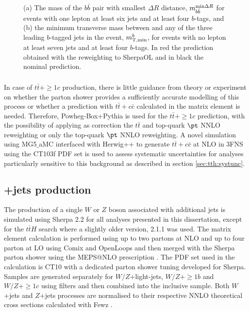 \begin{figure}[htb!]
\captionsetup{width=0.85\textwidth} \caption{\small (a) The mass of the $b\bar{b}$ pair with smallest $\Delta R$ distance, $m_{b\bar{b}}^{{\rm min}\Delta R}$ for events with one lepton at least six jets and at least four $b$-tags, and (b) the minimum transverse mass between \MET and any of the three leading $b$-tagged jets in the event, $m_{\rm T,min}^b$, for events with no lepton at least seven jets and at least four $b$-tags. In red the prediction obtained with the reweighting to {\sc SherpaOL} and in black the nominal prediction.}
\label{fig:dat:ttbb:reweigting}
\end{figure}

\subsubsection[$t\bar{t}+\ge 1c$]{}
\label{sec:data:ttc}
In case of $t\bar{t}+\ge1c$ production, there is little guidance from theory or experiment on whether the parton shower provides a sufficiently accurate modelling of this process or whether a prediction with $t\bar{t}+c\bar{c}$ calculated in the matrix element is needed. Therefore, {\sc Powheg-Box+Pythia} is used for the $t\bar{t}+\ge1c$ prediction, with the possibility of applying as correction the  $t\bar{t}$ and top-quark $\pt$ NNLO reweighting or only the top-quark $\pt$ NNLO  reweighting. A novel simulation \cite{ATL-PHYS-PUB-2016-011} using {\sc MG5$\_$aMC} interfaced with {\sc Herwig++} to generate $t\bar{t}+c\bar{c}$ at NLO in 3FNS using the CT103f PDF set is used to assess systematic uncertainties for analyses particularly sensitive to this background as described in section \ref{sec:tth:systunc}.

\subsection[$W/Z$+jets production]{+jets production}
The production of a single $W$ or $Z$ boson associated with additional jets is simulated using {\sc Sherpa} 2.2 for all analyses presented in this dissertation, except for the $t\bar{t}H$ search where a slightly older version, 2.1.1 was used. The matrix element calculation is performed using up to two partons at NLO and up to four parton at LO using {\sc Comix} and {\sc OpenLoops} and then merged with the {\sc Sherpa} parton shower using the MEPS@NLO prescription \cite{Hoeche:2012yf}. The PDF set used in the calculation is CT10 with a dedicated parton shower tuning developed for {\sc Sherpa}. Samples are generated separately for $W/Z$+light-jets, $W/Z+\ge1b$ and $W/Z+\ge1c$ using filters and then combined into the inclusive sample. Both $W$+jets and $Z$+jets processes are normalised to their respective NNLO theoretical cross sections calculated with {\sc Fewz} \cite{Anastasiou:2003ds}.

